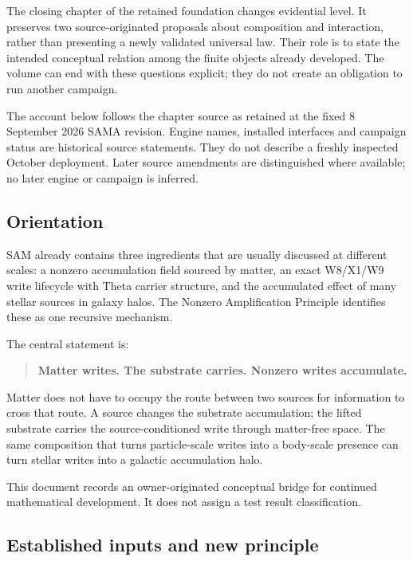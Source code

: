 \label{viii-ch12-relational-composition-and-the-boundary-of-the-volume}

The closing chapter of the retained foundation changes evidential level. It preserves two
source-originated proposals about composition and interaction, rather
than presenting a newly validated universal law. Their role is to state
the intended conceptual relation among the finite objects already
developed. The volume can end with these questions explicit; they do not
create an obligation to run another campaign.

The account below follows the chapter source as retained at the fixed 8
September 2026 SAMA revision. Engine names, installed interfaces and
campaign status are historical source statements. They do not describe a
freshly inspected October deployment. Later source amendments are
distinguished where available; no later engine or campaign is inferred.

\subsection{Orientation}\label{viii-ch12-orientation}

SAM already contains three ingredients that are usually discussed at
different scales: a nonzero accumulation field sourced by matter, an
exact W8/X1/W9 write lifecycle with Theta carrier structure, and the
accumulated effect of many stellar sources in galaxy halos. The Nonzero
Amplification Principle identifies these as one recursive mechanism.

The central statement is:

\begin{quote}
\textbf{Matter writes. The substrate carries. Nonzero writes
accumulate.}
\end{quote}

Matter does not have to occupy the route between two sources for
information to cross that route. A source changes the substrate
accumulation; the lifted substrate carries the source-conditioned write
through matter-free space. The same composition that turns
particle-scale writes into a body-scale presence can turn stellar writes
into a galactic accumulation halo.

This document records an owner-originated conceptual bridge for
continued mathematical development. It does not assign a test result
classification.

\subsection{Established inputs and new
principle}\label{viii-ch12-established-inputs-and-new-principle}

